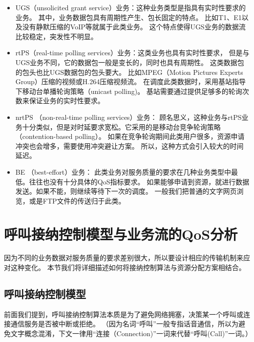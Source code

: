 \begin{itemize}
\item UGS（unsolicited grant service）业务：这种业务类型是指具有实时性要求的业务。
    其中，业务数据包具有周期性产生、包长固定的特点。
    比如T1、E1以及没有静默压缩的VoIP等就属于此类业务。
    这个特点使得UGS业务的数据流比较稳定，突发性不明显。
\item rtPS（real-time polling services）业务：这类业务也具有实时性要求，
    但是与UGS业务不同，它的数据包一般是变长的，同时也具有周期性。
    这类数据包的包头也比UGS数据包的包头要大。
    比如MPEG（Motion Pictures Experts Group）压缩的视频或H.264压缩视频流。
    在调度此类数据时，采用基站指导下移动台单播轮询策略（unicast polling)。
    基站需要通过提供足够多的轮询次数来保证业务的实时性要求。
\item nrtPS （non-real-time polling services）业务：
    顾名思义，这种业务与rtPS业务十分类似，但是对时延要求宽松。它采用的是移动台竞争轮询策略（contention-based polling）。
    如果在竞争轮询期间此类用户很多，资源申请冲突也会增多，需要使用冲突避让方案。
    所以，这种方式会引入较大的时间延迟。
\item BE （best-effort）业务：
    此类业务对服务质量的要求在几种业务类型中最低。往往也没有十分具体的QoS指标要求。
    如果能够申请到资源，就进行数据发送。如果不能，则继续等待下一次的调度。
    一般我们把普通的文字网页浏览，或是FTP文件的传送归于此类。
\end{itemize}

\section{呼叫接纳控制模型与业务流的QoS分析}
\label{sec_qos_metric}
因为不同的业务数据对服务质量的要求差别很大，所以要设计相应的传输机制来应对这种变化。
本节我们将详细描述如何将接纳控制算法与资源分配方案相结合。

\subsection{呼叫接纳控制模型}
\label{sec_sec_model}
前面我们提到，呼叫接纳控制算法本质是为了避免网络拥塞，决策某一个呼叫或连接通信服务是否被中断或拒绝。
（因为名词“呼叫”一般专指话音通信，所以为避免文字概念混淆，下文一律用“连接（Connection)”一词来代替“呼叫(Call)”一词。）


